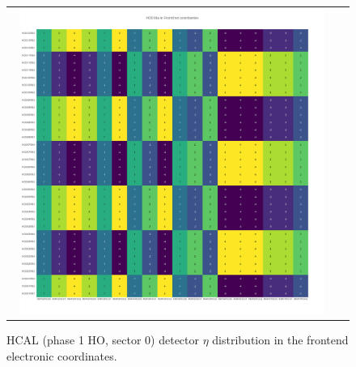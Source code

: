 \begin{figure}[htb]
 \begin{center}
  \begin{tabular}{cc}
   \includegraphics[angle=0,width=0.95\textwidth]{figures/appendix/HO0_Eta_in_FrontEnd.png}
  \end{tabular}
	\caption{HCAL (phase 1 HO, sector 0) detector $\eta$ distribution in the frontend electronic coordinates.}
  \label{fig:lmapHO0EtaFEC}
 \end{center}
\end{figure}
\clearpage

